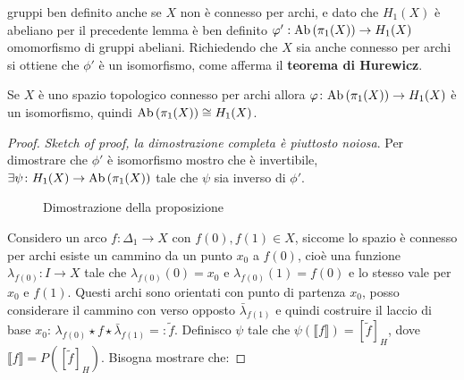 gruppi ben definito anche se $ X $ non è connesso per archi, e dato che
$ H_1(X) $ è abeliano per il precedente lemma è ben definito
$ \varphi': \mathrm{Ab}\left( \pi_1(X) \right) \to H_1(X) $ omomorfismo di gruppi abeliani. Richiedendo che
$ X $ sia anche connesso per archi si ottiene che $ \phi' $ è un isomorfismo, come
afferma il \textbf{teorema di Hurewicz}.
\begin{theorem}
  Se $ X $ è uno spazio topologico
  connesso per archi allora  $ \varphi \colon \mathrm{Ab}\left( \pi_1(X) \right) \to H_1(X) $
  è un isomorfismo, quindi $ \mathrm{Ab}\left( \pi_1(X) \right) \cong H_1(X) $.
\end{theorem}
\begin{proof}
  \emph{Sketch of proof, la dimostrazione completa è piuttosto noiosa}. Per
  dimostrare che $ \phi' $ è isomorfismo mostro che è invertibile,
  $ \exists \psi \colon H_1(X) \to \mathrm{Ab}\left( \pi_1(X) \right) $ tale che $ \psi $ sia inverso di $ \phi' $.
  \begin{figure}[htbp]
    \centering
    \caption{Dimostrazione della proposizione}
    \label{fig:lez3:sketch_of_proof}
  \end{figure}
  Considero un arco $ f \colon \Delta_1 \to X $ con $ f(0), f(1) \in X $, siccome lo spazio è
  connesso per archi esiste un cammino da un punto $ x_0 $ a $ f(0) $, cioè una
  funzione $ \lambda_{f(0)} \colon I \to X $ tale che
  $ \lambda_{f(0)}(0) = x_0 $ e $ \lambda_{f(0)}(1) = f(0) $ e lo stesso vale per
  $ x_0 $ e $ f(1) $. Questi archi sono orientati con punto di partenza $ x_0 $,
  posso considerare il cammino con verso opposto $ \bar{\lambda}_{f(1)} $ e quindi
  costruire il laccio di base $ x_0 $:
  $ \lambda_{f(0)} \star f \star \bar{\lambda}_{f(1)} =: \tilde{f} $. Definisco
  $ \psi $ tale che $ \psi( \llbracket f \rrbracket ) = [\tilde{f}]_H $, dove
  $ \llbracket f \rrbracket = P ([\tilde{f}]_H)$. Bisogna mostrare che:

\end{proof}
